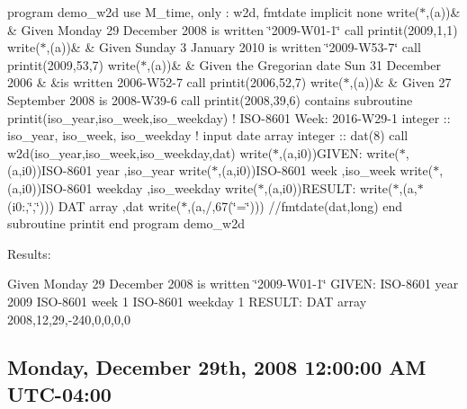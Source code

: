 program demo\+\_\+w2d use M\+\_\+time, only \+: w2d, fmtdate implicit none write($\ast$,\textquotesingle{}(a)\textquotesingle{})\& \& \textquotesingle{}Given Monday 29 December 2008 is written \char`\"{}2009-\/\+W01-\/1\char`\"{}\textquotesingle{} call printit(2009,1,1) write($\ast$,\textquotesingle{}(a)\textquotesingle{})\& \& \textquotesingle{}Given Sunday 3 January 2010 is written \char`\"{}2009-\/\+W53-\/7\char`\"{}\textquotesingle{} call printit(2009,53,7) write($\ast$,\textquotesingle{}(a)\textquotesingle{})\& \& \textquotesingle{}Given the Gregorian date Sun 31 December 2006 \& \&is written 2006-\/\+W52-\/7\textquotesingle{} call printit(2006,52,7) write($\ast$,\textquotesingle{}(a)\textquotesingle{})\& \& \textquotesingle{}Given 27 September 2008 is 2008-\/\+W39-\/6\textquotesingle{} call printit(2008,39,6) contains subroutine printit(iso\+\_\+year,iso\+\_\+week,iso\+\_\+weekday) ! I\+S\+O-\/8601 Week\+: 2016-\/\+W29-\/1 integer \+:\+: iso\+\_\+year, iso\+\_\+week, iso\+\_\+weekday ! input date array integer \+:\+: dat(8) call w2d(iso\+\_\+year,iso\+\_\+week,iso\+\_\+weekday,dat) write($\ast$,\textquotesingle{}(a,i0)\textquotesingle{})\textquotesingle{}G\+I\+V\+EN\+: \textquotesingle{} write($\ast$,\textquotesingle{}(a,i0)\textquotesingle{})\textquotesingle{}I\+S\+O-\/8601 year \textquotesingle{},iso\+\_\+year write($\ast$,\textquotesingle{}(a,i0)\textquotesingle{})\textquotesingle{}I\+S\+O-\/8601 week \textquotesingle{},iso\+\_\+week write($\ast$,\textquotesingle{}(a,i0)\textquotesingle{})\textquotesingle{}I\+S\+O-\/8601 weekday \textquotesingle{},iso\+\_\+weekday write($\ast$,\textquotesingle{}(a,i0)\textquotesingle{})\textquotesingle{}R\+E\+S\+U\+LT\+: \textquotesingle{} write($\ast$,\textquotesingle{}(a,$\ast$(i0\+:,\char`\"{},\char`\"{}))\textquotesingle{})\textquotesingle{} D\+AT array \textquotesingle{},dat write($\ast$,\textquotesingle{}(a,/,67(\char`\"{}=\char`\"{}))\textquotesingle{})\textquotesingle{} \textquotesingle{}//fmtdate(dat,\textquotesingle{}long\textquotesingle{}) end subroutine printit end program demo\+\_\+w2d

Results\+:

Given Monday 29 December 2008 is written \char`\"{}2009-\/\+W01-\/1\char`\"{} G\+I\+V\+EN\+: I\+S\+O-\/8601 year 2009 I\+S\+O-\/8601 week 1 I\+S\+O-\/8601 weekday 1 R\+E\+S\+U\+LT\+: D\+AT array 2008,12,29,-\/240,0,0,0,0 \subsection*{Monday, December 29th, 2008 12\+:00\+:00 AM U\+T\+C-\/04\+:00 }

